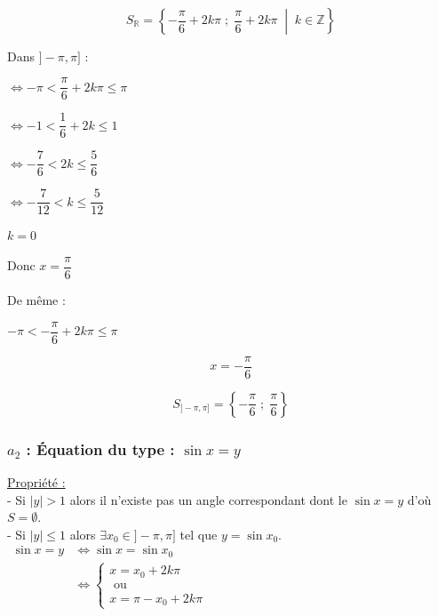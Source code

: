 \documentclass[12pt,a4paper]{article}
\begin{document}
\vspace{0.3cm}

\[
S_{\mathbb{R}} = \left\{ -\dfrac{\pi}{6} + 2k\pi \;;\; \dfrac{\pi}{6} + 2k\pi \;\middle|\; k \in \mathbb{Z} \right\}
\]

\vspace{0.3cm}

Dans $]-\pi, \pi]$ :

 $\iff -\pi < \dfrac{\pi}{6} + 2k\pi \le \pi$

 $\iff -1 < \dfrac{1}{6} + 2k \le 1$

 $\iff -\dfrac{7}{6} < 2k \le \dfrac{5}{6}$

 $\iff -\dfrac{7}{12} < k \le \dfrac{5}{12}$

\vspace{0.2cm}

$k = 0$

Donc $x = \dfrac{\pi}{6}$

\vspace{0.3cm}

De même :

 \quad $-\pi < -\dfrac{\pi}{6} + 2k\pi \le \pi$

\[
x = -\frac{\pi}{6}
\]

\[
S_{]-\pi, \pi]} = \left\{ -\frac{\pi}{6} \;;\; \frac{\pi}{6} \right\}
\]

\subsubsection*{\textbf{ $a_2$ : Équation du type : $\sin x = y$ }}

\underline{Propriété :} \\
- Si $|y| > 1$ alors il n'existe pas un angle correspondant dont le $\sin x = y$ d'où $S = \emptyset$. \\
- Si $|y| \le 1$ alors $\exists x_0 \in ]-\pi, \pi]$ tel que $y = \sin x_0$. \\

$
\begin{aligned}
\sin x = y &\iff \sin x = \sin x_0 \\
           &\iff \begin{cases} 
           x = x_0 + 2k\pi\\ 
           \text{ ou }\\
           x = \pi - x_0 + 2k\pi
           \end{cases}
\end{aligned}
$
\end{document}
